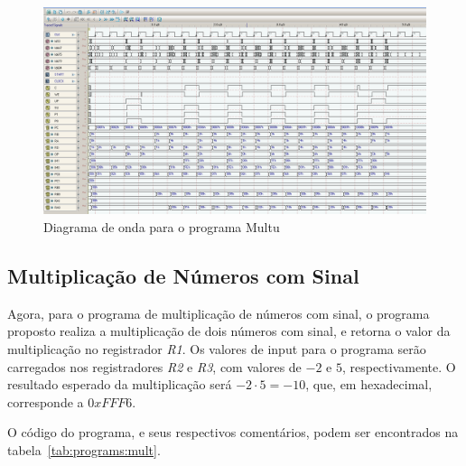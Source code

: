 \documentclass[12pt]{article}
\begin{document}
\begin{figure}[H]
    \centering
    \includegraphics[width=.9\textwidth]{Projeto/images/program__multu_wave.png}
    \caption{Diagrama de onda para o programa Multu}\label{fig:program__multu_wave.png}
\end{figure}

\subsection{Multiplicação de Números com Sinal}\label{sec:programs:mult}

Agora, para o programa de multiplicação de números com sinal, o programa
proposto realiza a multiplicação de dois números com sinal, e retorna o valor da
multiplicação no registrador \emph{R1}. Os valores de input para o programa
serão carregados nos registradores \emph{R2} e \emph{R3}, com valores de $-2$ e
$5$, respectivamente. O resultado esperado da multiplicação será
$-2 \cdot 5 = -10$, que, em hexadecimal, corresponde a $0xFFF6$.

O código do programa, e seus respectivos comentários, podem ser encontrados na
tabela~\ref{tab:programs:mult}.
\end{document}
